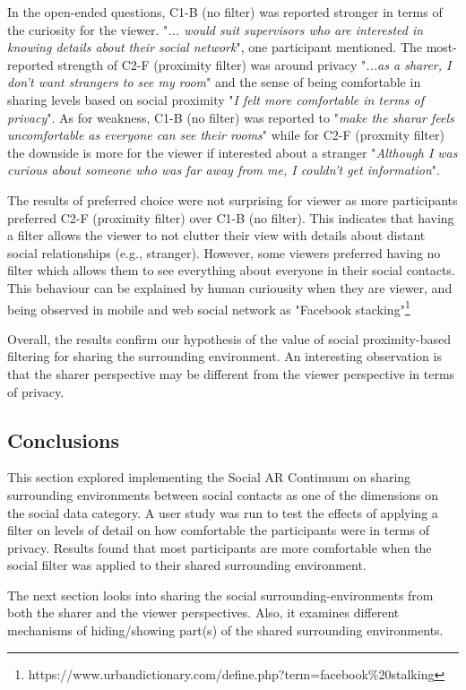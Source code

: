 In the open-ended questions, C1-B (no filter) was reported stronger in terms of the curiosity for the viewer. "\textit{... would suit supervisors who are interested in knowing details about their social network}", one participant mentioned. The most-reported strength of C2-F (proximity filter) was around privacy "\textit{...as a sharer, I don't want strangers to see my room}" and the sense of being comfortable in sharing levels based on social proximity "\textit{I felt more comfortable in terms of privacy}". As for weakness, C1-B (no filter) was reported to "\textit{make the sharar feels uncomfortable as everyone can see their rooms}" while for C2-F (proxmity filter) the downside is more for the viewer if interested about a stranger "\textit{Although I was curious about someone who was far away from me, I couldn't get information}".

The results of preferred choice were not surprising for viewer as more participants preferred C2-F (proximity filter) over C1-B (no filter). This indicates that having a filter allows the viewer to not clutter their view with details about distant social relationships (e.g., stranger). However, some viewers preferred having no filter which allows them to see everything about everyone in their social contacts. This behaviour can be explained by human curiousity when they are viewer, and being observed in mobile and web social network as "Facebook stacking"\footnote{https://www.urbandictionary.com/define.php?term=facebook\%20stalking}

Overall, the results confirm our hypothesis of the value of social proximity-based filtering for sharing the surrounding environment. An interesting observation is that the sharer perspective may be different from the viewer perspective in terms of privacy. 


\subsection{Conclusions}

This section explored implementing the Social AR Continuum on sharing surrounding environments between social contacts as one of the dimensions on the social data category. A user study was run to test the effects of applying a filter on levels of detail on how comfortable the participants were in terms of privacy. Results found that most participants are more comfortable when the social filter was applied to their shared surrounding environment.

The next section looks into sharing the social surrounding-environments from both the sharer and the viewer perspectives. Also, it examines different mechanisms of hiding/showing part(s) of the shared surrounding environments. 